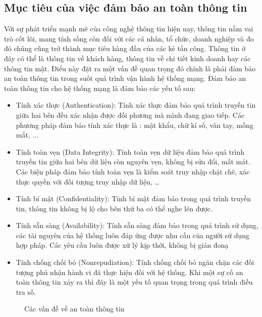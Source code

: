 \subsection{Mục tiêu của việc đảm bảo an toàn thông tin}
 Với sự phát triển mạnh mẽ của công nghệ thông tin hiện nay, thông tin nắm vai trò cốt lõi, mang tính sống còn đối với các cá nhân, tổ chức, doanh nghiệp và đo đó chúng cũng trở thành mục tiêu hàng đầu của các kẻ tấn công. Thông tin ở đây có thể là thông tin về khách hàng, thông tin về chi tiết kinh doanh hay các thông tin mật. Điểu này đặt ra một vấn đề quan trọng đó chính là phải đảm bảo an toàn thông tin trong suốt quá trình vận hành hệ thống mạng. Đảm bảo an toàn thông tin cho hệ thống mạng là đảm bảo các yếu tố sau:
 \begin{itemize}
     \item Tính xác thực (Authentication): Tính xác thực đảm bảo quá trình truyền tin giữa hai bên đều xác nhận được đối phương mà mình đang giao tiếp. Các phương pháp đảm bảo tính xác thực là : mật khẩu, chữ kí số, vân tay, mống mắt, ...
     \item Tính toàn vẹn (Data Integrity): Tính toàn vẹn dữ liệu đảm bảo quá trình truyền tin giữa hai bên dữ liệu còn nguyên vẹn, không bị sửa đổi, mất mát. Các biện pháp đảm bảo tính toàn vẹn là kiểm soát truy nhập chặt chẽ, xác thực quyền với đối tượng truy nhập dữ liệu, …
     \item Tính bí mật (Confidentiality): Tính bí mật đảm bảo trong quá trình truyền tin, thông tin không bị lộ cho bên thứ ba có thể nghe lén được.
     \item 	Tính sẵn sàng (Availability): Tính sẵn sàng đảm bảo trong quá trình sử dụng, các tài nguyên của hệ thống luôn đáp ứng được nhu cầu của người sử dụng hợp pháp. Các yêu cầu luôn được xử lý kịp thời, không bị gián đonạ
     \item Tính chống chối bỏ (Nonrepudiation): Tính chống chối bỏ ngăn chặn các đối tượng phủ nhận hành vi đã thực hiện đối với hệ thống. Khi một sự cố an toàn thông tin xảy ra thì đây là một yếu tố quan trọng trong quá trình điều tra số.
 \end{itemize}
 
 
\begin{figure}[H]
    \centering
    \caption{Các vấn đề về an toàn thông tin}
     
\end{figure}

